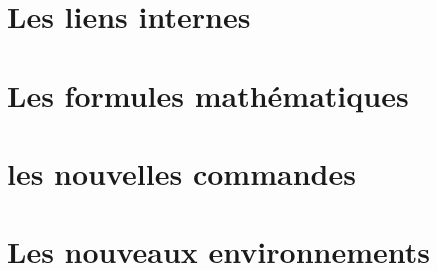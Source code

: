 \documentclass[10pt,a4paper]{report}
\begin{document}
\section{Les liens internes}

\section{Les formules mathématiques}

\section{les nouvelles commandes}

\section{Les nouveaux environnements}
\end{document}
